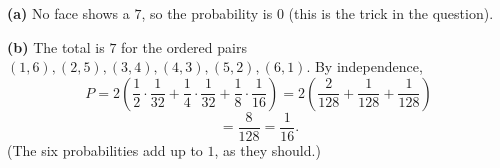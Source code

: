 \textbf{(a)} No face shows a $7$, so the probability is $\boxed{0}$ (this is the trick in the question).

\textbf{(b)} The total is $7$ for the ordered pairs $(1,6),(2,5),(3,4),(4,3),(5,2),(6,1)$. By independence,
\[P=2\left(\dfrac12\cdot\dfrac{1}{32}+\dfrac14\cdot\dfrac{1}{32}+\dfrac18\cdot\dfrac{1}{16}\right)=2\left(\dfrac{2}{128}+\dfrac{1}{128}+\dfrac{1}{128}\right)\]
\[=\dfrac{8}{128}=\boxed{\dfrac{1}{16}}.\]
(The six probabilities add up to $1$, as they should.)
